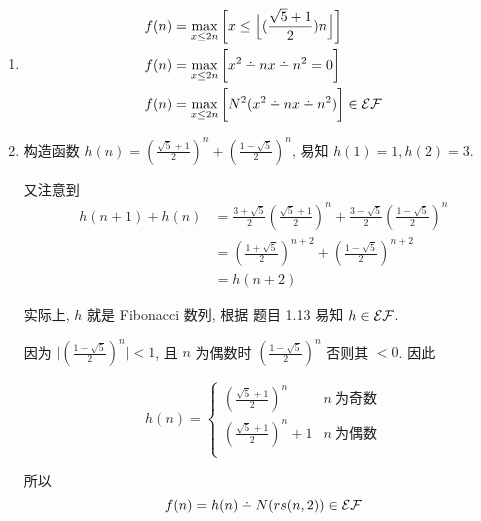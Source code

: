 \begin{solution}
\begin{enumerate}
\item 
\begin{align*}
f(n) & = \max_{x \le 2n} \bigg [ x \le \Big \lfloor (\frac{\sqrt{5} + 1}{2}) n \Big \rfloor \bigg ] \\
f(n) & = \max_{x \le 2n} \bigg [ x^2 \dotminus nx \dotminus n^2 = 0 \bigg ] \\
f(n) & = \max_{x \le 2n} \bigg [ N^2(x^2 \dotminus nx \dotminus n^2) \bigg ] \in \EF \\
\end{align*}
\item 
构造函数 $h(n) = (\frac{\sqrt{5}+1}{2})^n + (\frac{1 - \sqrt{5}}{2})^n$, 易知 $h(1) = 1, h(2) = 3$.

又注意到 
\begin{align*}
h(n + 1) + h(n) & = \frac{3 + \sqrt{5}}{2} (\frac{\sqrt{5} + 1}{2})^{n} + \frac{3 - \sqrt{5}}{2} (\frac{1 - \sqrt{5}}{2})^{n} \\
& =(\frac{1 + \sqrt{5}}{2})^{n+2} + (\frac{1 - \sqrt{5}}{2})^{n+2} \\
& = h(n + 2)
\end{align*}

实际上, $h$ 就是 Fibonacci 数列, 根据 题目 1.13 易知 $h \in \mathcal{EF}$.

因为 $\big |(\frac{1 - \sqrt{5}}{2})^{n} \big | < 1$, 且 $n$ 为偶数时 $(\frac{1 - \sqrt{5}}{2})^{n}$ 否则其 $< 0$. 因此

\[
h(n) = \begin{cases}(\frac{\sqrt{5}+1}{2})^n & n ~ \text{为奇数} \\
(\frac{\sqrt{5}+1}{2})^n + 1 & n ~ \text{为偶数} \\
\end{cases}
\]

所以
\[
f(n) = h(n) \dotminus N(rs(n, 2)) \in \EF
\]
\end{enumerate}
\end{solution}